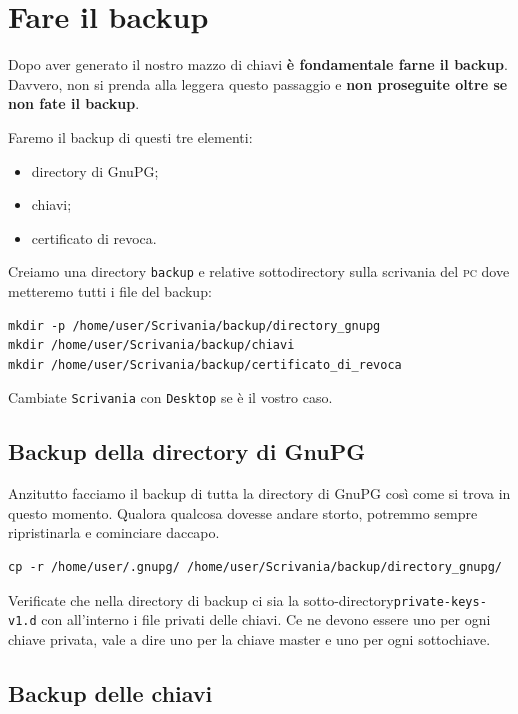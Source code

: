 \documentclass[a4paper,10pt]{article}
\begin{document}
\section{Fare il backup}

Dopo aver generato il nostro mazzo di chiavi \textbf{è fondamentale farne il backup}. Davvero, non si prenda alla leggera questo passaggio e \textbf{non proseguite oltre se non fate il backup}.

Faremo il backup di questi tre elementi:

\begin{itemize}
 \item directory di GnuPG;
 \item chiavi;
 \item certificato di revoca.
\end{itemize}

Creiamo una directory \texttt{backup} e relative sottodirectory sulla scrivania del \textsc{pc} dove metteremo tutti i file del backup:

\begin{lstlisting}
mkdir -p /home/user/Scrivania/backup/directory_gnupg
mkdir /home/user/Scrivania/backup/chiavi
mkdir /home/user/Scrivania/backup/certificato_di_revoca
\end{lstlisting}


Cambiate \texttt{Scrivania} con \texttt{Desktop} se è il vostro caso.

\subsection{Backup della directory di GnuPG} \label{backup-directory-gnupg}

Anzitutto facciamo il backup di tutta la directory di GnuPG così come si trova in questo momento. Qualora qualcosa dovesse andare storto, potremmo sempre ripristinarla e cominciare daccapo.

\begin{lstlisting}
cp -r /home/user/.gnupg/ /home/user/Scrivania/backup/directory_gnupg/
\end{lstlisting}

Verificate che nella directory di backup ci sia la sotto-directory\newline \texttt{private-keys-v1.d} con all'interno i file privati delle chiavi. Ce ne devono essere uno per ogni chiave privata, vale a dire uno per la chiave master e uno per ogni sottochiave.

\subsection{Backup delle chiavi} \label{backup-chiavi}
\end{document}
